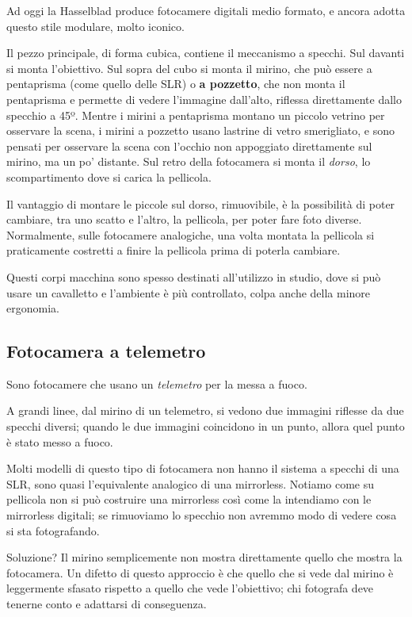 Ad oggi la Hasselblad produce fotocamere digitali medio formato, e ancora adotta questo stile modulare, molto iconico.

Il pezzo principale, di forma cubica, contiene il meccanismo a specchi. Sul davanti si monta l'obiettivo. Sul sopra del cubo si monta il mirino, che può essere a pentaprisma (come quello delle SLR) o \textbf{a pozzetto}, che non monta il pentaprisma e permette di vedere l'immagine dall'alto, riflessa direttamente dallo specchio a 45º. Mentre i mirini a pentaprisma montano un piccolo vetrino per osservare la scena, i mirini a pozzetto usano lastrine di vetro smerigliato, e sono pensati per osservare la scena con l'occhio non appoggiato direttamente sul mirino, ma un po' distante.
Sul retro della fotocamera si monta il \textit{dorso}, lo scompartimento dove si carica la pellicola.

Il vantaggio di montare le piccole sul dorso, rimuovibile, è la possibilità di poter cambiare, tra uno scatto e l'altro, la pellicola, per poter fare foto diverse.
Normalmente, sulle fotocamere analogiche, una volta montata la pellicola si praticamente costretti a finire la pellicola prima di poterla cambiare.

Questi corpi macchina sono spesso destinati all'utilizzo in studio, dove si può usare un cavalletto e l'ambiente è più controllato, colpa anche della minore ergonomia.


\subsection{Fotocamera a telemetro} \label{subsec:telemetro}
Sono fotocamere che usano un \textit{telemetro} per la messa a fuoco.

A grandi linee, dal mirino di un telemetro, si vedono due immagini riflesse da due specchi diversi; quando le due immagini coincidono in un punto, allora quel punto è stato messo a fuoco.

Molti modelli di questo tipo di fotocamera non hanno il sistema a specchi di una SLR, sono quasi l'equivalente analogico di una mirrorless.
Notiamo come su pellicola non si può costruire una mirrorless così come la intendiamo con le mirrorless digitali; se rimuoviamo lo specchio non avremmo modo di vedere cosa si sta fotografando.

Soluzione? Il mirino semplicemente non mostra direttamente quello che mostra la fotocamera. Un difetto di questo approccio è che quello che si vede dal mirino è leggermente sfasato rispetto a quello che vede l'obiettivo; chi fotografa deve tenerne conto e adattarsi di conseguenza.



